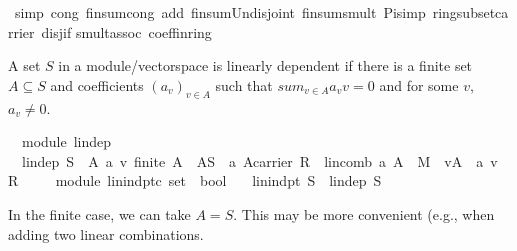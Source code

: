 \begin{isabellebody}
\ {\isacharparenleft}simp\ cong{\isacharcolon}\ finsum{\isacharunderscore}cong{}\ add{\isacharcolon}\ finsum{\isacharunderscore}Un{\isacharunderscore}disjoint\ finsum{\isacharunderscore}smult\ Pi{\isacharunderscore}simp\ ring{\isacharunderscore}subset{\isacharunderscore}carrier\ disj{\isacharunderscore}if\isanewline
smult{\isacharunderscore}assoc{}\ coeff{\isacharunderscore}in{\isacharunderscore}ring{\isacharparenright}\isanewline
{}\isamarkupfalse%
%
\endisatagproof
{\isafoldproof}%
%
\isadelimproof
%
\endisadelimproof
%
\isamarkuptrue%
%
\begin{isamarkuptext}%
A set $S$ in a module/vectorspace is linearly dependent if there is a finite set $A \subseteq S$
 and coefficients $(a_v)_{v\in A}$ such that $sum_{v\in A} a_vv=0$ and for some $v$, $a_v\neq 0$.%
\end{isamarkuptext}%
\isamarkuptrue%
\isamarkupfalse%
\ {\isacharparenleft}\ module{\isacharparenright}\ lin{\isacharunderscore}dep\ \isanewline
\ \ {\isachardoublequoteopen}lin{\isacharunderscore}dep\ S\ {\isacharequal}\ {\isacharparenleft}{\isasymexists}A\ a\ v{\isachardot}\ {\isacharparenleft}finite\ A\ {\isasymand}\ A{\isasymsubseteq}S\ {\isasymand}\ {\isacharparenleft}a{\isasymin}\ {\isacharparenleft}A{\isasymrightarrow}carrier\ R{\isacharparenright}{\isacharparenright}\ {\isasymand}\ {\isacharparenleft}lincomb\ a\ A\ {\isacharequal}\ {\isasymzero}\isactrlbsub M\isactrlesub {\isacharparenright}\ {\isasymand}\ {\isacharparenleft}v{\isasymin}A{\isacharparenright}\ {\isasymand}\ {\isacharparenleft}a\ v{\isasymnoteq}\ {\isasymzero}\isactrlbsub R\isactrlesub {\isacharparenright}{\isacharparenright}{\isacharparenright}{\isachardoublequoteclose}\isanewline
\ \ \isanewline
\isanewline
{}\isamarkupfalse%
\ {\isacharparenleft}\ module{\isacharparenright}\ lin{\isacharunderscore}indpt{\isacharcolon}{\isacharcolon}{\isachardoublequoteopen}{\isacharprime}c\ set\ {\isasymRightarrow}\ bool{\isachardoublequoteclose}\isanewline
\ \ \ {\isachardoublequoteopen}lin{\isacharunderscore}indpt\ S\ {\isasymequiv}\ {\isasymnot}lin{\isacharunderscore}dep\ S{\isachardoublequoteclose}%
\begin{isamarkuptext}%
In the finite case, we can take $A=S$. This may be more convenient (e.g., when adding two
linear combinations.%
\end{isamarkuptext}%
\isamarkuptrue%
\isamarkupfalse%

\end{isabellebody}
